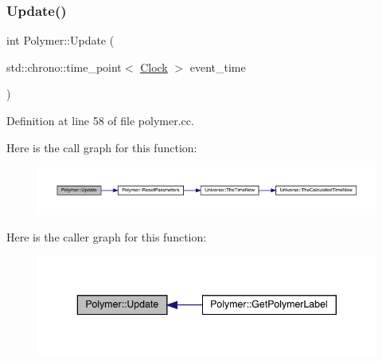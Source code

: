 \subsubsection{\texorpdfstring{Update()}{Update()}}
{\footnotesize\ttfamily int Polymer\+::\+Update (\begin{DoxyParamCaption}\item[{std\+::chrono\+::time\+\_\+point$<$ \hyperlink{universe_8h_a0ef8d951d1ca5ab3cfaf7ab4c7a6fd80}{Clock} $>$}]{event\+\_\+time }\end{DoxyParamCaption})}



Definition at line 58 of file polymer.\+cc.

Here is the call graph for this function\+:
\nopagebreak
\begin{figure}[H]
\begin{center}
\leavevmode
\includegraphics[width=350pt]{class_polymer_ac82f603c3010212122008c4ed3953045_cgraph}
\end{center}
\end{figure}
Here is the caller graph for this function\+:
\nopagebreak
\begin{figure}[H]
\begin{center}
\leavevmode
\includegraphics[width=343pt]{class_polymer_ac82f603c3010212122008c4ed3953045_icgraph}
\end{center}
\end{figure}



